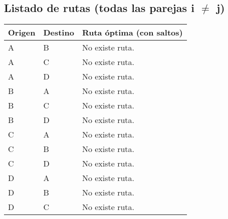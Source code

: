 \documentclass{article}
\begin{document}
\subsection*{Listado de rutas (todas las parejas i $\neq$ j)}
\begin{longtable}{llp{}}
\toprule
\textbf{Origen} & \textbf{Destino} & \textbf{Ruta óptima (con saltos)}\\\midrule
A & B & No existe ruta.\\
A & C & No existe ruta.\\
A & D & No existe ruta.\\
B & A & No existe ruta.\\
B & C & No existe ruta.\\
B & D & No existe ruta.\\
C & A & No existe ruta.\\
C & B & No existe ruta.\\
C & D & No existe ruta.\\
D & A & No existe ruta.\\
D & B & No existe ruta.\\
D & C & No existe ruta.\\
\bottomrule
\end{longtable}
\end{document}
